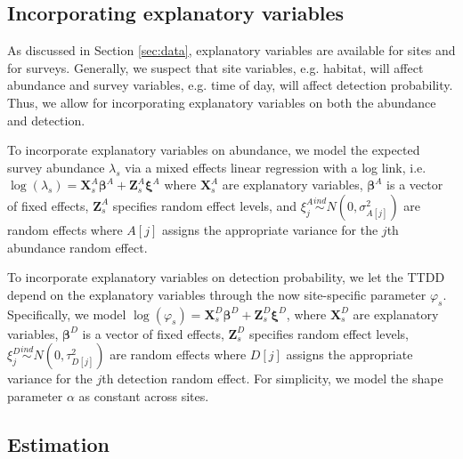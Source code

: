 \documentclass[useAMS,usenatbib,referee,12pt]{article}
\newcommand{\vX}{\textbf{X}}
\newcommand{\vZ}{\textbf{Z}}
\newcommand{\vbeta}{\boldsymbol{\beta}}
\newcommand{\vxi}{\boldsymbol{\xi}}
\newcommand{\ind}{\stackrel{ind}{\sim}}
\begin{document}
\subsection{Incorporating explanatory variables}\label{sec:covariates}

As discussed in Section \ref{sec:data}, explanatory variables are available for sites and for surveys. 
Generally, we suspect that site variables, e.g. habitat, will affect abundance and survey variables, e.g. time of day, will affect detection probability. 
Thus, we allow for incorporating explanatory variables on both the abundance and detection.

To incorporate explanatory variables on abundance, we model the expected survey abundance $\lambda_{s}$ via a mixed effects linear regression with a log link, i.e. $\log (\lambda_{s}) = \vX_{s}^A\vbeta^A + \vZ_{s}^A\vxi^A$ where $\vX_{s}^A$ are explanatory variables, $\vbeta^A$ is a vector of fixed effects, $\vZ_{s}^A$ specifies random effect levels, and $\xi_j^A \ind N(0,\sigma_{A[j]}^2)$ are random effects where $A[j]$ assigns the appropriate variance for the $j$th abundance random effect.  

To incorporate explanatory variables on detection probability, we let the TTDD depend on the explanatory variables through the now site-specific parameter $\varphi_s$. 
Specifically, we model $\log(\varphi_{s}) = \vX_{s}^D\vbeta^D + \vZ_{s}^D\vxi^D$, where $\vX_{s}^D$ are explanatory variables, $\vbeta^D$ is a vector of fixed effects, $\vZ_{s}^D$ specifies random effect levels, $\xi_j^D \ind N(0,\tau_{D[j]}^2)$ are random effects where $D[j]$ assigns the appropriate variance for the $j$th detection random effect.  
For simplicity, we model the shape parameter $\alpha$ as constant across sites.



\subsection{Estimation}
\end{document}
